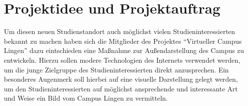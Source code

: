 \section{Projektidee und Projektauftrag}
\label{sec:Projektidee}

Um diesen neuen Studienstandort auch möglichst vielen Studieninteressierten
bekannt zu machen haben sich die Mitglieder des Projektes "`Virtueller Campus
Lingen"' dazu eintschieden eine Maßnahme zur Außendarstellung des Campus zu
entwickeln. Hierzu sollen modere Technologien des Internets verwendet werden, um
die junge Zielgruppe des Studieninteressierten direkt anzusprechen. Ein
besonderes Augenmerk soll hierbei auf eine visuelle Darstellung gelegt werden,
um den Studieninteressierten auf möglichst ansprechende und interessante Art und
Weise ein Bild vom Campus Lingen zu vermitteln.

